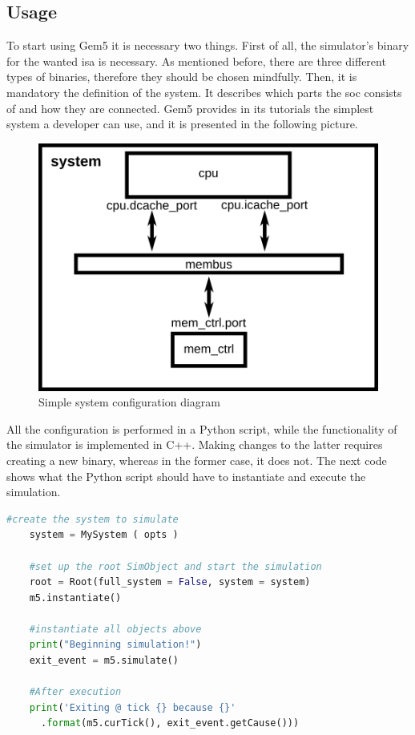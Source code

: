 
\subsection{Usage}

To start using Gem5 it is necessary two things. First of all, the simulator's binary for the wanted \gls{isa} is necessary. As mentioned before, there are three different types of binaries, therefore they should be chosen mindfully. Then, it is mandatory the definition of the system. It describes which parts the \gls{soc} consists of and how they are connected. Gem5 provides in its tutorials the simplest system a developer can use, and it is presented in the following picture.

\begin{figure}[H]
	\centering
 	\includegraphics[width=0.5\linewidth]{Images/simple_config.png}
 	\caption{Simple system configuration diagram}
	 \label{fig_simple_config}
\end{figure}

All the configuration is performed in a Python script, while the functionality of the simulator is implemented in C++. Making changes to the latter requires creating a new binary, whereas in the former case, it does not. The next code shows what the Python script should have to instantiate and execute the simulation. 

\begin{lstlisting}[language=Python, caption=Script to instantiate and execute the simulation]
    #create the system to simulate
    system = MySystem ( opts )

    #set up the root SimObject and start the simulation
    root = Root(full_system = False, system = system)
    m5.instantiate()

    #instantiate all objects above
    print("Beginning simulation!")
    exit_event = m5.simulate()

    #After execution
    print('Exiting @ tick {} because {}'
      .format(m5.curTick(), exit_event.getCause()))

\end{lstlisting}

